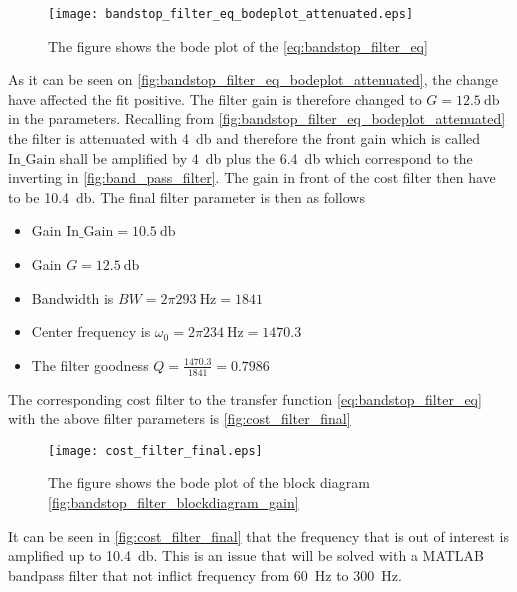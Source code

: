 \begin{figure}[H]
	\centering
	\texttt{[image: bandstop\_filter\_eq\_bodeplot\_attenuated.eps]}
	\caption{The figure shows the bode plot of the \autoref{eq:bandstop_filter_eq}}
		\label{fig:bandstop_filter_eq_bodeplot_attenuated}
\end{figure}


As it can be seen on \autoref{fig:bandstop_filter_eq_bodeplot_attenuated}, the change have affected the fit positive. The filter gain is therefore changed to  $G = \SI{12.5}{\decibel}$ in the parameters. Recalling from \autoref{fig:bandstop_filter_eq_bodeplot_attenuated} the filter is attenuated with \SI{4}{\decibel} and therefore the front gain which is called $\text{In_Gain}$ shall be amplified by \SI{4}{\decibel} plus the \SI{6.4}{\decibel} which correspond to the inverting in \autoref{fig:band_pass_filter}. The gain in front of the cost filter then have to be \SI{10.4}{\decibel}. The final filter parameter is then as follows




\begin{itemize}
\item Gain $\text{In_Gain} = \SI{10.5}{\decibel}$
\item Gain $G = \SI{12.5}{\decibel}$
\item Bandwidth is $BW = 2\pi \SI{293}{\hertz} = 1841$
\item Center frequency is $\omega_0 = 2\pi \SI{234}{\hertz} = 1470.3$
\item The filter goodness $Q = \frac{1470.3}{1841} = 0.7986$
\end{itemize}




The corresponding cost filter to the transfer function \autoref{eq:bandstop_filter_eq} with the above filter parameters is \autoref{fig:cost_filter_final}

\begin{figure}[H]
	\centering
	\texttt{[image: cost\_filter\_final.eps]}
	\caption{The figure shows the bode plot of the block diagram \autoref{fig:bandstop_filter_blockdiagram_gain}}
		\label{fig:cost_filter_final}
\end{figure}

It can be seen in \autoref{fig:cost_filter_final} that the frequency that is out of interest is amplified up to \SI{10.4}{\decibel}. This is an issue that will be solved with a MATLAB bandpass filter that not inflict frequency from \SI{60}{\hertz} to \SI{300}{\hertz}.
 


